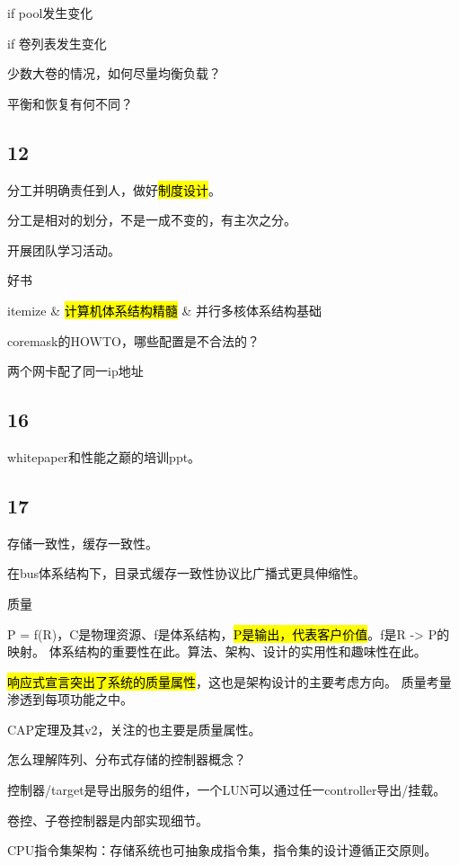 if pool发生变化

if 卷列表发生变化

少数大卷的情况，如何尽量均衡负载？

平衡和恢复有何不同？

\subsection{12}

分工并明确责任到人，做好\hl{制度设计}。

分工是相对的划分，不是一成不变的，有主次之分。

开展团队学习活动。

好书
\begin{myeasylist}{itemize}
& \hl{计算机体系结构精髓}
& 并行多核体系结构基础
\end{myeasylist}

coremask的HOWTO，哪些配置是不合法的？

两个网卡配了同一ip地址

\subsection{16}

whitepaper和性能之巅的培训ppt。

\subsection{17}

存储一致性，缓存一致性。

在bus体系结构下，目录式缓存一致性协议比广播式更具伸缩性。

\hrulefill

质量

P = f(R)，C是物理资源、f是体系结构，\hl{P是输出，代表客户价值}。f是R -> P的映射。
体系结构的重要性在此。算法、架构、设计的实用性和趣味性在此。

\hl{响应式宣言突出了系统的质量属性}，这也是架构设计的主要考虑方向。
质量考量渗透到每项功能之中。

CAP定理及其v2，关注的也主要是质量属性。

怎么理解阵列、分布式存储的控制器概念？

控制器/target是导出服务的组件，一个LUN可以通过任一controller导出/挂载。

卷控、子卷控制器是内部实现细节。

CPU指令集架构：存储系统也可抽象成指令集，指令集的设计遵循正交原则。

